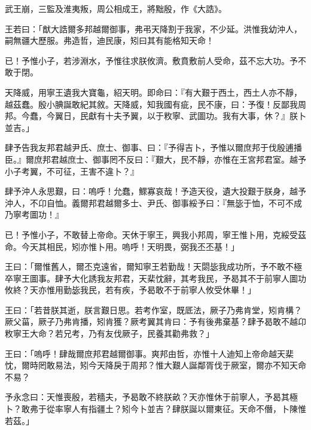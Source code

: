 
\begin{pinyinscope}
武王崩，三監及淮夷叛，周公相成王，將黜殷，作《大誥》。

王若曰：「猷大誥爾多邦越爾御事，弗弔天降割于我家，不少延。洪惟我幼沖人，嗣無疆大歷服。弗造哲，迪民康，矧曰其有能格知天命！

已！予惟小子，若涉淵水，予惟往求朕攸濟。敷賁敷前人受命，茲不忘大功。予不敢于閉。

天降威，用寧王遺我大寶龜，紹天明。即命曰：『有大艱于西土，西土人亦不靜，越茲蠢。殷小腆誕敢紀其敘。天降威，知我國有疵，民不康，曰：予復！反鄙我周邦。今蠢，今翼日，民獻有十夫予翼，以于敉寧、武圖功。我有大事，休？』朕卜並吉。」

肆予告我友邦君越尹氏、庶士、御事、曰：『予得吉卜，予惟以爾庶邦于伐殷逋播臣。』爾庶邦君越庶士、御事罔不反曰：『艱大，民不靜，亦惟在王宮邦君室。越予小子考翼，不可征，王害不違卜？』

肆予沖人永思艱，曰：嗚呼！允蠢，鰥寡哀哉！予造天役，遺大投艱于朕身，越予沖人，不卬自恤。義爾邦君越爾多士、尹氏、御事綏予曰：『無毖于恤，不可不成乃寧考圖功！』

已！予惟小子，不敢替上帝命。天休于寧王，興我小邦周，寧王惟卜用，克綏受茲命。今天其相民，矧亦惟卜用。嗚呼！天明畏，弼我丕丕基！」

王曰：「爾惟舊人，爾丕克遠省，爾知寧王若勤哉！天閟毖我成功所，予不敢不極卒寧王圖事。肆予大化誘我友邦君，天棐忱辭，其考我民，予曷其不于前寧人圖功攸終？天亦惟用勤毖我民，若有疾，予曷敢不于前寧人攸受休畢！」

王曰：「若昔朕其逝，朕言艱日思。若考作室，既厎法，厥子乃弗肯堂，矧肯構？厥父菑，厥子乃弗肯播，矧肯獲？厥考翼其肯曰：予有後弗棄基？肆予曷敢不越卬敉寧王大命？若兄考，乃有友伐厥子，民養其勸弗救？」

王曰：「嗚呼！肆哉爾庶邦君越爾御事。爽邦由哲，亦惟十人迪知上帝命越天棐忱，爾時罔敢易法，矧今天降戾于周邦？惟大艱人誕鄰胥伐于厥室，爾亦不知天命不易？

予永念曰：天惟喪殷，若穡夫，予曷敢不終朕畝？天亦惟休于前寧人，予曷其極卜？敢弗于從率寧人有指疆土？矧今卜並吉？肆朕誕以爾東征。天命不僭，卜陳惟若茲。」


\end{pinyinscope}
